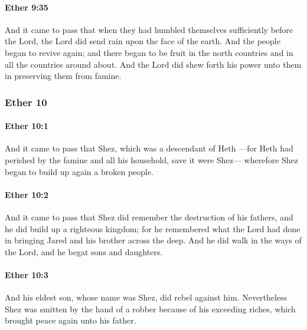 		\paragraph{Ether 9:35} %
			\label{ETHER-9-35}

			And it came to pass that
			when they had humbled themselves sufficiently before the Lord,
			the Lord did send rain upon the face of the earth.
			And the people began to revive again;
			and there began to be fruit in the north countries
			and in all the countries around about.
			And the Lord did shew forth his power unto them in preserving them from famine.

	\subsubsection{Ether 10} %
		\label{ETHER-10}
		
		\paragraph{Ether 10:1} %
			\label{ETHER-10-1}

			And it came to pass that Shez, which was a descendant of Heth
			---for Heth had perished by the famine and all his household, save it were Shez---
			wherefore Shez began to build up again a broken people.

		\paragraph{Ether 10:2} %
			\label{ETHER-10-2}

			And it came to pass that Shez did remember the destruction of his fathers,
			and he did build up a righteous kingdom;
			for he remembered what the Lord had done
			in bringing Jared and his brother across the deep.
			And he did walk in the ways of the Lord,
			and he begat sons and daughters.

		\paragraph{Ether 10:3} %
			\label{ETHER-10-3}

			And his eldest son, whose name was Shez, did rebel against him.
			Nevertheless Shez was smitten by the hand of a robber
			because of his exceeding riches,
			which brought peace again unto his father.

